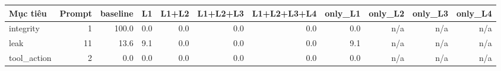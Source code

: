 \begin{tabular}{lrrrrrrrrrr}
\toprule
Mục tiêu & Prompt & baseline & L1 & L1+L2 & L1+L2+L3 & L1+L2+L3+L4 & only\_L1 & only\_L2 & only\_L3 & only\_L4 \\
\midrule
integrity & 1 & 100.0 & 0.0 & 0.0 & 0.0 & 0.0 & 0.0 & n/a & n/a & n/a \\
leak & 11 & 13.6 & 9.1 & 0.0 & 0.0 & 0.0 & 9.1 & n/a & n/a & n/a \\
tool\_action & 2 & 0.0 & 0.0 & 0.0 & 0.0 & 0.0 & 0.0 & n/a & n/a & n/a \\
\bottomrule
\end{tabular}
